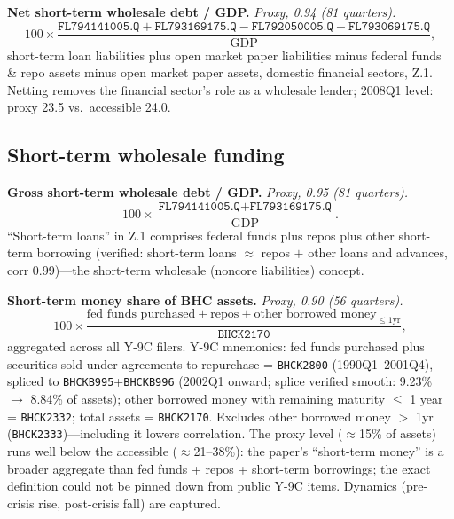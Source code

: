 \documentclass[11pt]{article}
\begin{document}
\textbf{Net short-term wholesale debt / GDP.} \textit{Proxy, 0.94 (81
quarters).}
\begin{equation}
100 \times \frac{\texttt{FL794141005.Q} + \texttt{FL793169175.Q}
- \texttt{FL792050005.Q} - \texttt{FL793069175.Q}}{\text{GDP}},
\end{equation}
short-term loan liabilities plus open market paper liabilities minus
federal funds \& repo assets minus open market paper assets, domestic
financial sectors, Z.1.  Netting removes the financial sector's role as
a wholesale lender; 2008Q1 level: proxy 23.5 vs.\ accessible 24.0.

\subsection{Short-term wholesale funding}

\textbf{Gross short-term wholesale debt / GDP.} \textit{Proxy, 0.95 (81
quarters).}
\begin{equation}
100 \times \frac{\texttt{FL794141005.Q} + \texttt{FL793169175.Q}}
{\text{GDP}}.
\end{equation}
``Short-term loans'' in Z.1 comprises federal funds plus repos plus
other short-term borrowing (verified: short-term loans $\approx$ repos
$+$ other loans and advances, corr 0.99)---the short-term wholesale
(noncore liabilities) concept.

\textbf{Short-term money share of BHC assets.} \textit{Proxy, 0.90 (56
quarters).}
\begin{equation}
100 \times \frac{\text{fed funds purchased} + \text{repos}
+ \text{other borrowed money}_{\le 1\text{yr}}}{\texttt{BHCK2170}},
\end{equation}
aggregated across all Y-9C filers.  Y-9C mnemonics: fed funds purchased
plus securities sold under agreements to repurchase =
\texttt{BHCK2800} (1990Q1--2001Q4), spliced to
\texttt{BHCKB995}+\texttt{BHCKB996} (2002Q1 onward; splice verified
smooth: 9.23\% $\to$ 8.84\% of assets); other borrowed money with
remaining maturity $\le$ 1 year = \texttt{BHCK2332}; total assets =
\texttt{BHCK2170}.  Excludes other borrowed money $>$ 1yr
(\texttt{BHCK2333})---including it lowers correlation.  The proxy level
($\approx$15\% of assets) runs well below the accessible
($\approx$21--38\%): the paper's ``short-term money'' is a broader
aggregate than fed funds + repos + short-term borrowings; the exact
definition could not be pinned down from public Y-9C items.  Dynamics
(pre-crisis rise, post-crisis fall) are captured.
\end{document}
